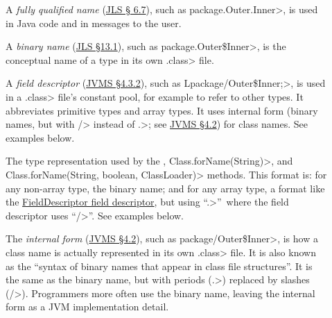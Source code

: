 \begin{description}

\item[]
  A \emph{fully qualified name} (\href{https://docs.oracle.com/javase/specs/jls/se8/html/jls-6.html#jls-6.7}{JLS \S
    6.7}), such as
  \<package.Outer.Inner>, is used in Java code and in messages to
  the user.

\item[]
  A \emph{binary name} (\href{https://docs.oracle.com/javase/specs/jls/se8/html/jls-13.html#jls-13.1}{JLS \S 13.1}), such as
  \<package.Outer\$Inner>, is
  the conceptual name of a type in its own \<.class> file.

\item[]
  A \emph{field descriptor} (\href{https://docs.oracle.com/javase/specs/jvms/se8/html/jvms-4.html#jvms-4.3.2}{JVMS \S 4.3.2}), such as
  \<Lpackage/Outer\$Inner;>, is used in a \<.class> file's constant pool,
  for example to refer to other types.  It abbreviates primitive types and
  array types.  It uses internal form (binary names, but with \</> instead of
  \<.>; see
  \href{https://docs.oracle.com/javase/specs/jvms/se8/html/jvms-4.html#jvms-4.2.1}{JVMS
    \S 4.2}) for class names.  See examples below.

\item[]
\begin{sloppypar}
  The type representation used by the
  , \<Class.forName(String)>,
  and \<Class.forName(String, boolean, ClassLoader)> methods.  This format
  is:  for any non-array type, the binary name; and for any array type, a
  format like the
  \href{https://docs.oracle.com/javase/specs/jvms/se8/html/jvms-4.html#jvms-4.3.2}{FieldDescriptor
    field descriptor}, but using
  ``\<.>''~where the field descriptor uses ``\</>''.  See examples below.
\end{sloppypar}

\item[]
  The \emph{internal form}
  (\href{https://docs.oracle.com/javase/specs/jvms/se8/html/jvms-4.html#jvms-4.2}{JVMS
    \S 4.2}), such as \<package/Outer\$Inner>, is how a class name is
  actually represented in its own \<.class> file.  It is also known as the
  ``syntax of binary names that appear in class file structures''.  It is
  the same as the binary name, but with periods (\<.>) replaced by slashes
  (\</>).  Programmers more often use the binary name, leaving the internal
  form as a JVM implementation detail.


\end{description}
